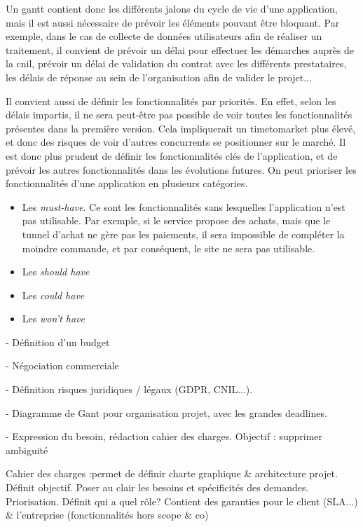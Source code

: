 
Un \gls{gantt} contient donc les différents jalons du cycle de vie d'une application, mais il est aussi nécessaire de prévoir les éléments pouvant être bloquant. Par exemple, dans le cas de collecte de données utilisateurs afin de réaliser un traitement, il convient de prévoir un délai pour effectuer les démarches auprès de la \gls{cnil}, prévoir un délai de validation du contrat avec les différents prestataires, les délais de réponse au sein de l'organisation afin de valider le projet...

Il convient aussi de définir les fonctionnalités par priorités. En effet, selon les délais impartis, il ne sera peut-être pas possible de voir toutes les fonctionnalités présentes dans la première version. Cela impliquerait un \gls{timetomarket} plus élevé, et donc des risques de voir d'autres concurrents se positionner sur le marché. Il est donc plus prudent de définir les fonctionnalités clés de l'application, et de prévoir les autres fonctionnalités dans les évolutions futures. On peut prioriser les fonctionnalités d'une application en plusieurs catégories.

\begin{itemize}
	\item Les \emph{must-have}. Ce sont les fonctionnalités sans lesquelles l'application n'est pas utilisable. Par exemple, si le service propose des achats, mais que le tunnel d'achat ne gère pas les paiements, il sera impossible de compléter la moindre commande, et par conséquent, le site ne sera pas utilisable.
	\item Les \emph{should have}
	\item Les \emph{could have}
	\item Les \emph{won't have}
\end{itemize}


- Définition d'un budget

- Négociation commerciale

- Définition risques juridiques / légaux (GDPR, CNIL...).

- Diagramme de Gant pour organisation projet, avec les grandes deadlines.

- Expression du besoin, rédaction cahier des charges. Objectif : supprimer ambiguité

Cahier des charges :permet de définir charte graphique \& architecture projet. Définit objectif. Poser au clair les besoins et spécificités des demandes. Priorisation. Définit qui a quel rôle? Contient des garanties pour le client (SLA...) \& l'entreprise (fonctionnalités hors scope \& co)

